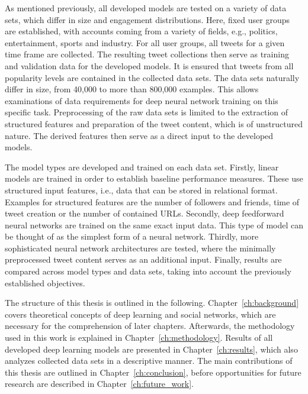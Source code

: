 As mentioned previously, all developed models are tested on a variety of data
sets, which differ in size and engagement distributions.
Here, fixed user groups are established, with accounts coming from a variety
of fields, e.g., politics, entertainment, sports and industry.
For all user groups, all tweets for a given time frame are collected.
The resulting tweet collections then serve as training and validation data for
the developed models.
It is ensured that tweets from all popularity levels are contained in the
collected data sets.
The data sets naturally differ in size, from 40,000 to more than 800,000 examples.
This allows examinations of data requirements for deep neural network training
on this specific task.
Preprocessing of the raw data sets is limited to the extraction of structured
features and preparation of the tweet content, which is of unstructured nature.
The derived features then serve as a direct input to the developed models.

The model types are developed and trained on each data set.
Firstly, linear models are trained in order to establish baseline performance
measures.
These use structured input features, i.e., data that can be stored in
relational format.
Examples for structured features are the number of followers and friends, time
of tweet creation or the number of contained URLs.
Secondly, deep feedforward neural networks are trained on the same exact input
data.
This type of model can be thought of as the simplest form of a neural network.
Thirdly, more sophisticated neural network architectures are tested, where
the minimally preprocessed tweet content serves as an additional input.
Finally, results are compared across model types and data sets, taking into
account the previously established objectives.

The structure of this thesis is outlined in the following.
Chapter~\ref{ch:background} covers theoretical concepts of deep learning and
social networks, which are necessary for the comprehension of later chapters.
Afterwards, the methodology used in this work is explained in Chapter~\ref{ch:methodology}.
Results of all developed deep learning models are presented in Chapter~\ref{ch:results},
which also analyzes collected data sets in a descriptive manner.
The main contributions of this thesis are outlined in Chapter~\ref{ch:conclusion},
before opportunities for future research are described in Chapter~\ref{ch:future_work}.
